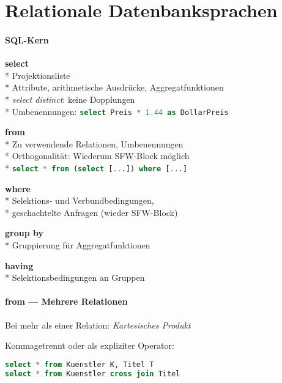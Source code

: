 \section{Relationale Datenbanksprachen}
\label{sec:sql}

\paragraph{SQL-Kern}
\begin{items}
	\item \textbf{select} \\*
		Projektionsliste \\*
		Attribute, arithmetische Ausdrücke, Aggregatfunktionen \\*
		\emph{select distinct}: keine Dopplungen\\*
		Umbenennungen: \lstinline[language=sql]{select Preis * 1.44 as DollarPreis }
	\item \textbf{from} \\*
		Zu verwendende Relationen, Umbenennungen\\*
		Orthogonalität: Wiederum SFW-Block möglich\\*
		\lstinline[language=sql]{select * from (select [...]) where [...] }
	\item \textbf{where} \\*
		Selektions- und Verbundbedingungen, \\*
		geschachtelte Anfragen (wieder SFW-Block)
	\item \textbf{group by} \\*
		Gruppierung für Aggregatfunktionen
	\item \textbf{having} \\*
		Selektionsbedingungen an Gruppen
\end{items}

\paragraph{from --- Mehrere Relationen}
\begin{items}
	\item Bei mehr als einer Relation: \emph{Kartesisches Produkt}
	\item Kommagetrennt oder als expliziter Operator:
	\begin{lstlisting}[language=sql]
select * from Kuenstler K, Titel T
select * from Kuenstler cross join Titel
	\end{lstlisting}
\end{items}

